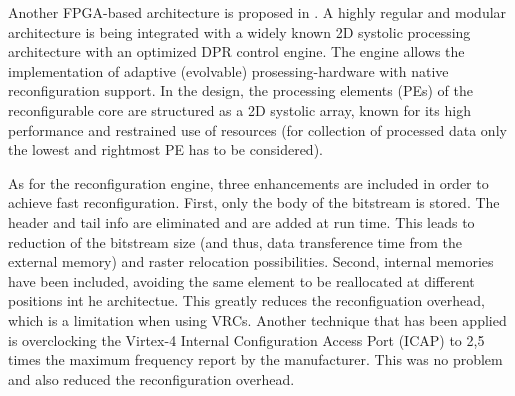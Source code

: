 
Another FPGA-based architecture is proposed in \cite{dpr}. A highly regular and modular architecture is being integrated with a widely known 2D systolic processing architecture with an optimized DPR control engine. The engine allows the implementation of adaptive (evolvable) prosessing-hardware with native reconfiguration support. In the design, the processing elements (PEs) of the reconfigurable core are structured as a 2D systolic array, known for its high performance and restrained use of resources (for collection of processed data only the lowest and rightmost PE has to be considered).

As for the reconfiguration engine, three enhancements are included in order to achieve fast reconfiguration. First, only the body of the bitstream is stored. The header and tail info are eliminated and are added at run time. This leads to reduction of the bitstream size (and thus, data transference time from the external memory) and raster relocation possibilities. Second, internal memories have been included, avoiding  the same element to be reallocated at different positions int he architectue. This greatly reduces the reconfiguation overhead, which is a limitation when using VRCs. Another technique that has been applied is overclocking the Virtex-4 Internal Configuration Access Port (ICAP) to 2,5 times the maximum frequency report by the manufacturer. This was no problem and also reduced the reconfiguration overhead.
